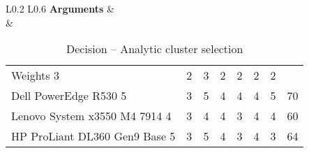 \begin{table}[H]
\begin{tabular}{L{0.2\textwidth} L{0.6\textwidth}}
		\midrule
		\textbf{Arguments}      & \\
		&   \begin{tabular}{l|llllll|l}
		                                  & \rot{Reliability} & \rot{Performance} & \rot{Interoperability} & \rot{Security} & \rot{Scalability} & \rot{Cost} & \rot{\textbf{Score}} \\ \hline
		Weights                         3 & 2 & 3 & 2 & 2 & 2 & 2 \\ \hline
		Dell PowerEdge R530             5 & 3                 & 5                 & 4                      & 4              & 4                 & 5          & 70                   \\ 
		Lenovo System x3550 M4 7914     4 & 3                 & 4                 & 4                      & 3              & 4                 & 4          & 60                   \\
		HP ProLiant DL360 Gen9 Base     5 & 3                 & 5                 & 4                      & 3              & 4                 & 3          & 64                   \\
	\end{tabular} \\
	\\ \bottomrule
	\end{tabular}
	\caption{Decision -- Analytic cluster selection}
	\label{table:server-selection}
\end{table}

